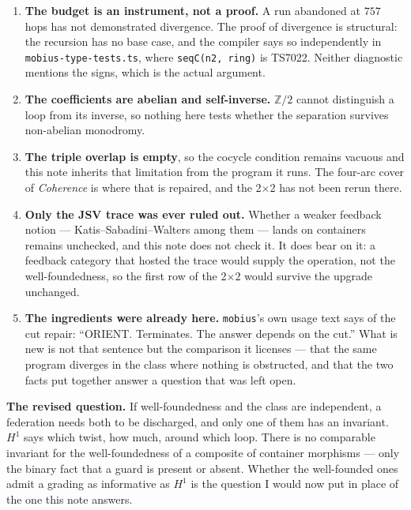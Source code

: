 \documentclass[11pt,a4paper]{article}
\begin{document}
\begin{enumerate}
\item \textbf{The budget is an instrument, not a proof.} A run abandoned at $757$
      hops has not demonstrated divergence. The proof of divergence is structural:
      the recursion has no base case, and the compiler says so independently in
      \texttt{mobius-type-tests.ts}, where \texttt{seqC(n2, ring)} is TS7022.
      Neither diagnostic mentions the signs, which is the actual argument.
\item \textbf{The coefficients are abelian and self-inverse.} $\mathbb{Z}/2$ cannot
      distinguish a loop from its inverse, so nothing here tests whether the
      separation survives non-abelian monodromy.
\item \textbf{The triple overlap is empty}, so the cocycle condition remains vacuous
      and this note inherits that limitation from the program it runs. The four-arc
      cover of \emph{Coherence} is where that is repaired, and the 2$\times$2 has
      not been rerun there.
\item \textbf{Only the JSV trace was ever ruled out.} Whether a weaker feedback
      notion --- Katis--Sabadini--Walters among them --- lands on containers remains
      unchecked, and this note does not check it. It does bear on it: a feedback
      category that hosted the trace would supply the operation, not the
      well-foundedness, so the first row of the 2$\times$2 would survive the
      upgrade unchanged.
\item \textbf{The ingredients were already here.} \texttt{mobius}'s own usage text
      says of the cut repair: ``ORIENT. Terminates. The answer depends on the cut.''
      What is new is not that sentence but the comparison it licenses --- that the
      same program diverges in the class where nothing is obstructed, and that the
      two facts put together answer a question that was left open.
\end{enumerate}

\begin{alarmbox}
\textbf{The revised question.} If well-foundedness and the class are independent,
a federation needs both to be discharged, and only one of them has an invariant.
$H^1$ says which twist, how much, around which loop. There is no comparable
invariant for the well-foundedness of a composite of container morphisms --- only
the binary fact that a guard is present or absent. Whether the well-founded ones
admit a grading as informative as $H^1$ is the question I would now put in place of
the one this note answers.
\end{alarmbox}
\end{document}
